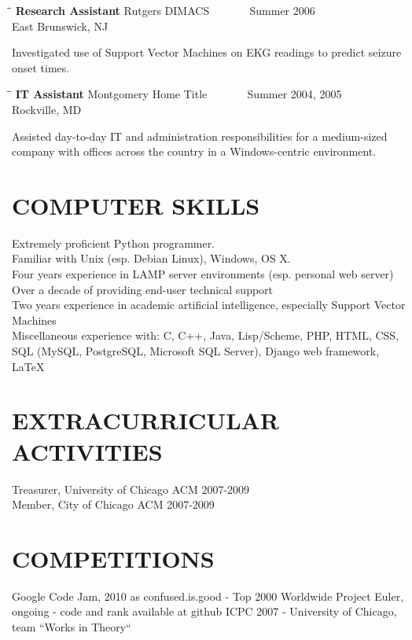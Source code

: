 \documentclass{res}
\begin{document}
\begin{resume}
   \begin{tabbing}%
   \hspace{2.3in}\= \hspace{2.6in}\= \kill %
   {\bf Research Assistant}  \>Rutgers DIMACS \> ~~~~~~ Summer 2006\\
                          \>East Brunswick, NJ
   \end{tabbing}\vspace{-20pt}
   Investigated use of Support Vector Machines on EKG readings to predict seizure onset times.
   \begin{tabbing}
   \hspace{2.3in}\= \hspace{2.6in}\= \kill %
    {\bf IT Assistant} \>Montgomery Home Title \> ~~~~~~ Summer 2004, 2005\\
                             \>Rockville, MD
   \end{tabbing}\vspace{-20pt}      %
   Assisted day-to-day IT and administration responsibilities for a medium-sized company with offices across the country in a Windows-centric environment. 


\section{COMPUTER SKILLS}          
    Extremely proficient Python programmer. \\
    Familiar with Unix (esp. Debian Linux), Windows, OS X.\\
    Four years experience in LAMP server environments (esp. personal web server)\\
    Over a decade of providing end-user technical support \\
    Two years experience in academic artificial intelligence, especially Support Vector Machines \\
    Miscellaneous experience with: C, C++, Java, Lisp/Scheme, PHP, HTML, CSS, SQL (MySQL, PostgreSQL, Microsoft SQL Server), Django web framework, \LaTeX

 
\section{EXTRACURRICULAR ACTIVITIES}          
    Treasurer, University of Chicago ACM 2007-2009 \\         
    Member, City of Chicago ACM 2007-2009

\section{ COMPETITIONS }
    Google Code Jam, 2010 as confused.is.good - Top 2000 Worldwide
    Project Euler, ongoing - code and rank available at github
    ICPC 2007 - University of Chicago, team ``Works in Theory``

    
 
\end{resume}
\end{document}
